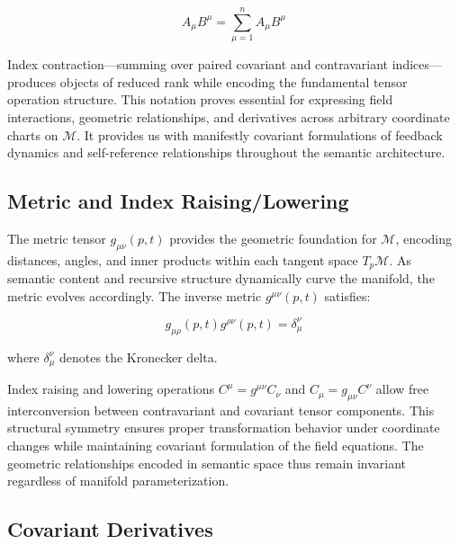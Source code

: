 \begin{equation}
A_\mu B^\mu = \sum_{\mu=1}^n A_\mu B^\mu
\end{equation}

Index contraction—summing over paired covariant and contravariant indices—produces objects of reduced rank while encoding the fundamental tensor operation structure. This notation proves essential for expressing field interactions, geometric relationships, and derivatives across arbitrary coordinate charts on \(\mathcal{M}\). It provides us with manifestly covariant formulations of feedback dynamics and self-reference relationships throughout the semantic architecture.

\subsection{Metric and Index Raising/Lowering}
\label{2.4.2:metric_and_index_raising_lowering}

The metric tensor \(g_{\mu\nu}(p,t)\) provides the geometric foundation for \(\mathcal{M}\), encoding distances, angles, and inner products within each tangent space \(T_p\mathcal{M}\). As semantic content and recursive structure dynamically curve the manifold, the metric evolves accordingly. The inverse metric \(g^{\mu\nu}(p,t)\) satisfies:

\begin{equation}
g_{\mu\rho}(p,t) g^{\rho\nu}(p,t) = \delta_\mu^\nu
\end{equation}

where \(\delta_\mu^\nu\) denotes the Kronecker delta.

Index raising and lowering operations \(C^\mu = g^{\mu\nu} C_\nu\) and \(C_\mu = g_{\mu\nu} C^\nu\) allow free interconversion between contravariant and covariant tensor components. This structural symmetry ensures proper transformation behavior under coordinate changes while maintaining covariant formulation of the field equations. The geometric relationships encoded in semantic space thus remain invariant regardless of manifold parameterization.


\subsection{Covariant Derivatives}
\label{2.4.3:covariant_derivatives}

